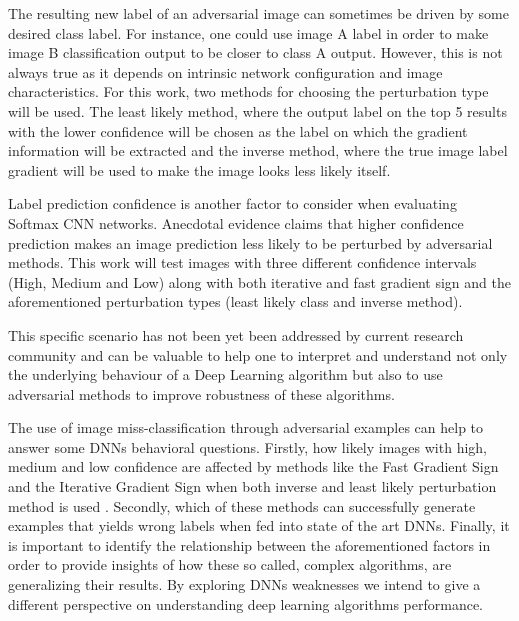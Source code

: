 \documentclass[10pt,journal,compsoc]{IEEEtran}
\begin{document}
The resulting new label of an adversarial image can sometimes be driven by some desired class label. For instance, one could use image A label in order to make image B classification output to be closer to class A output. However, this is not always true as it depends on intrinsic network configuration and image characteristics. For this work, two methods for choosing the perturbation type will be used. The least likely method, where the output label on the top 5 results with the lower confidence will be chosen as the label on which the gradient information will be extracted and the inverse method, where the true image label gradient will be used to make the image looks less likely itself.

Label prediction confidence is another factor to consider when evaluating Softmax CNN networks. Anecdotal evidence claims that higher confidence prediction makes an image prediction less likely to be perturbed by adversarial methods. This work will test images with three different confidence intervals (High, Medium and Low) along with both iterative and fast gradient sign and the aforementioned perturbation types (least likely class and inverse method).

This specific scenario has not been yet been addressed by current research community and can be valuable to help one to interpret and understand not only the underlying behaviour of a Deep Learning algorithm but also to use adversarial methods to improve robustness of these algorithms. 

The use of image miss-classification through adversarial examples can help to answer some DNNs behavioral questions. Firstly, how likely images with high, medium and low confidence are affected by methods like the Fast Gradient Sign and the Iterative Gradient Sign when both inverse and least likely perturbation method is used \cite{goodfellow2014}\cite{goodfellow2016}. Secondly, which of these methods can successfully generate examples that yields wrong labels when fed into state of the art DNNs. Finally, it is important to identify the relationship between the aforementioned factors in order to provide insights of how these so called, complex algorithms, are generalizing their results. By exploring DNNs weaknesses we intend to give a different perspective on understanding deep learning algorithms performance.
\end{document}
